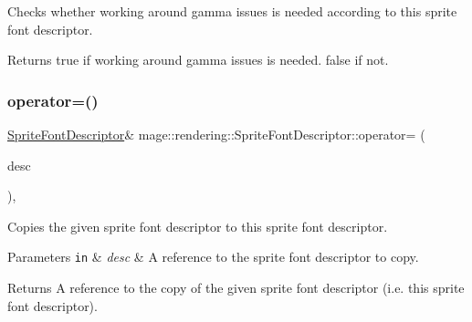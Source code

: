 Checks whether working around gamma issues is needed according to this sprite font descriptor.

\begin{DoxyReturn}{Returns}
{\ttfamily true} if working around gamma issues is needed. {\ttfamily false} if not. 
\end{DoxyReturn}
\mbox{\label{classmage_1_1rendering_1_1_sprite_font_descriptor_ab486bf77ca702ecd2f9c34a43206b2e3}} 
\subsubsection{\texorpdfstring{operator=()}{operator=()}\hspace{0.1cm}{\footnotesize\ttfamily [1/2]}}
{\footnotesize\ttfamily \mbox{\hyperlink{classmage_1_1rendering_1_1_sprite_font_descriptor}{Sprite\+Font\+Descriptor}}\& mage\+::rendering\+::\+Sprite\+Font\+Descriptor\+::operator= (\begin{DoxyParamCaption}\item[{const \mbox{\hyperlink{classmage_1_1rendering_1_1_sprite_font_descriptor}{Sprite\+Font\+Descriptor}} \&}]{desc }\end{DoxyParamCaption})\hspace{0.3cm}{\ttfamily [default]}, {\ttfamily [noexcept]}}

Copies the given sprite font descriptor to this sprite font descriptor.


\begin{DoxyParams}[1]{Parameters}
\mbox{\tt in}  & {\em desc} & A reference to the sprite font descriptor to copy. \\
\hline
\end{DoxyParams}
\begin{DoxyReturn}{Returns}
A reference to the copy of the given sprite font descriptor (i.\+e. this sprite font descriptor). 
\end{DoxyReturn}
\mbox{\label{classmage_1_1rendering_1_1_sprite_font_descriptor_a49a53f458d277278389c62f5aaba3c59}} 
